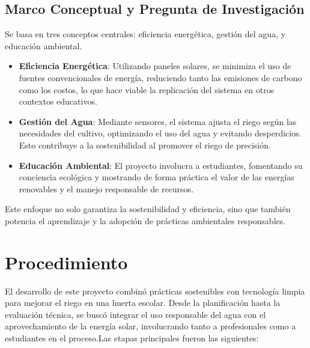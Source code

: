 \documentclass[12pt]{article}
\begin{document}
\subsection*{Marco Conceptual y Pregunta de Investigación}
Se basa en tres conceptos centrales: eficiencia energética, gestión del agua, y educación ambiental.
\begin{itemize}
      \item \textbf{Eficiencia Energética}: Utilizando paneles solares, se minimiza el uso de fuentes convencionales de energía, reduciendo tanto las emisiones de carbono como los costos, lo que hace viable la replicación del sistema en otros contextos educativos.
      \item \textbf{Gestión del Agua}: Mediante sensores, el sistema ajusta el riego según las necesidades del cultivo, optimizando el uso del agua y evitando desperdicios. Esto contribuye a la sostenibilidad al promover el riego de precisión.
      \item \textbf{Educación Ambiental}: El proyecto involucra a estudiantes, fomentando su conciencia ecológica y mostrando de forma práctica el valor de las energías renovables y el manejo responsable de recursos.
\end{itemize}

Este enfoque no solo garantiza la sostenibilidad y eficiencia, sino que también potencia el aprendizaje y la adopción de prácticas ambientales responsables.
\newpage
\section{Procedimiento}

El desarrollo de este proyecto combinó prácticas sostenibles con tecnología limpia para mejorar el riego en una huerta escolar. Desde la planificación hasta la evaluación técnica, se buscó integrar el uso responsable del agua con el aprovechamiento de la energía solar, involucrando tanto a profesionales como a estudiantes en el proceso.Las etapas principales fueron las siguientes:
\end{document}
